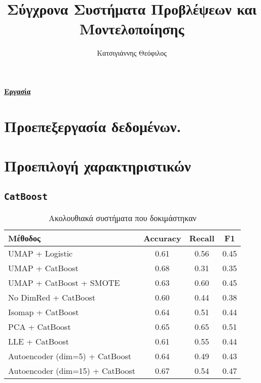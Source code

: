 \documentclass[a4paper,12pt]{article}
\title{Σύγχρονα Συστήματα Προβλέψεων και Μοντελοποίησης}
\author{Κατσιγιάννης Θεόφιλος}
\newcommand{\tl}{\textlatin}
\newcommand{\code}[1]{\textlatin{\texttt{#1}}}
\begin{document}
\maketitle
\begin{center}
\textbf{\underline{\large{Εργασία}}}
\end{center}
\section{Προεπεξεργασία δεδομένων.}
\section{Προεπιλογή χαρακτηριστικών}
\subsection{\code{CatBoost}}
\begin{table}[ht]
\centering
\begin{tabular}{|l|c|c|c|}
\hline
\textbf{Μέθοδος} & \textbf{\tl{Accuracy}} & \textbf{\tl{Recall}} & \textbf{\tl{F1 }} \\
\hline
\tl{UMAP + Logistic} & 0.61 & 0.56 & 0.45 \\
\tl{UMAP + CatBoost} & 0.68 & 0.31 & 0.35 \\
\tl{UMAP + CatBoost + SMOTE} & 0.63 & 0.60 & 0.45 \\
\tl{No DimRed + CatBoost} & 0.60 & 0.44 & 0.38 \\
\tl{Isomap + CatBoost} & 0.64 & 0.51 & 0.44 \\
\tl{PCA + CatBoost} & 0.65 & 0.65 & 0.51 \\
\tl{LLE + CatBoost} & 0.61 & 0.55 & 0.44 \\
\tl{Autoencoder (dim=5) + CatBoost} & 0.64 & 0.49 & 0.43 \\
\tl{Autoencoder (dim=15) + CatBoost} & 0.67 & 0.54 & 0.47 \\
\hline
\end{tabular}
\caption{Ακολουθιακά συστήματα που δοκιμάστηκαν}
\label{tab:pipeline_comparison}
\end{table}
\end{document}

